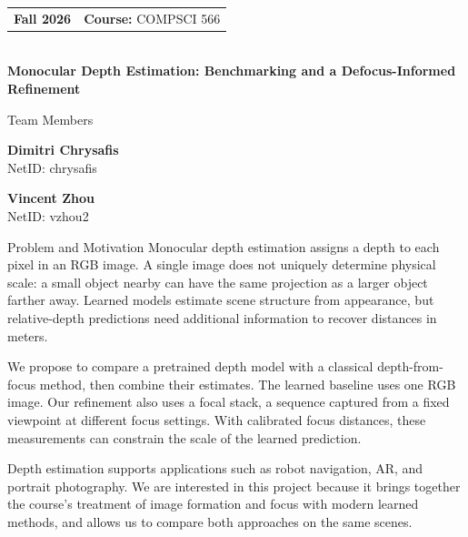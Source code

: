 \documentclass[11pt]{article}
\newcommand{\Course}{COMPSCI 566}
\newcommand{\Assignment}{Project Proposal}
\newcommand{\ProjectTitle}{Monocular Depth Estimation: Benchmarking and a Defocus-Informed Refinement}
\newcommand{\Date}{\today}
\begin{document}
\begin{tcolorbox}[
  enhanced,
  arc=2.5mm,
  boxrule=0pt,
  colback=TitleBg,
  colframe=TitleBg,
  borderline south={1.5pt}{0pt}{Secondary},
  title={\textcolor{white}{\Assignment\ \textbullet\ \Date}},
  coltitle=white,
  fonttitle=\bfseries,
  before skip=0pt,
  after skip=5pt
]
  {\color{white}
  \begin{tabular*}{\textwidth}{@{\extracolsep{\fill}}ll}
    \textbf{Fall 2026} & \textbf{Course:} \Course
  \end{tabular*}\\[3pt]
  {\color{white}\textbf{\ProjectTitle}}
  }
\end{tcolorbox}

\begin{proposalbox}{Team Members}
\begin{minipage}[t]{0.44\textwidth}
\begin{tcolorbox}[enhanced, arc=1.5mm, boxrule=0.7pt, colback=white, colframe=Primary!70!black, left=2mm, right=2mm, top=1.5mm, bottom=1.5mm]
\centering\textbf{Dimitri Chrysafis}\\[1pt]
NetID: chrysafis
\end{tcolorbox}
\end{minipage}
\hfill
\begin{minipage}[t]{0.44\textwidth}
\begin{tcolorbox}[enhanced, arc=1.5mm, boxrule=0.7pt, colback=white, colframe=Primary!70!black, left=2mm, right=2mm, top=1.5mm, bottom=1.5mm]
\centering\textbf{Vincent Zhou}\\[1pt]
NetID: vzhou2
\end{tcolorbox}
\end{minipage}
\end{proposalbox}

\begin{proposalbox}{Problem and Motivation}
Monocular depth estimation assigns a depth to each pixel in an RGB image. A single image does not uniquely determine physical scale: a small object nearby can have the same projection as a larger object farther away. Learned models estimate scene structure from appearance, but relative-depth predictions need additional information to recover distances in meters.

We propose to compare a pretrained depth model with a classical depth-from-focus method, then combine their estimates. The learned baseline uses one RGB image. Our refinement also uses a focal stack, a sequence captured from a fixed viewpoint at different focus settings. With calibrated focus distances, these measurements can constrain the scale of the learned prediction.

Depth estimation supports applications such as robot navigation, AR, and portrait photography. We are interested in this project because it brings together the course's treatment of image formation and focus with modern learned methods, and allows us to compare both approaches on the same scenes.
\end{proposalbox}
\end{document}
